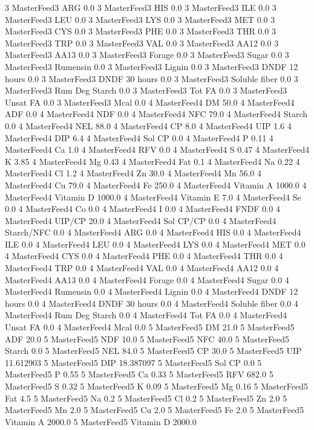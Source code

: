 \documentclass[letterpaper,10pt,english]{sphinxmanual}
\begin{document}
\begin{sphinxVerbatim}[commandchars=\\\{\},numbers=left,firstnumber=1,stepnumber=1]
3 MasterFeed3 ARG 0.0
3 MasterFeed3 HIS 0.0
3 MasterFeed3 ILE 0.0
3 MasterFeed3 LEU 0.0
3 MasterFeed3 LYS 0.0
3 MasterFeed3 MET 0.0
3 MasterFeed3 CYS 0.0
3 MasterFeed3 PHE 0.0
3 MasterFeed3 THR 0.0
3 MasterFeed3 TRP 0.0
3 MasterFeed3 VAL 0.0
3 MasterFeed3 AA\PYGZsh{}12 0.0
3 MasterFeed3 AA\PYGZsh{}13 0.0
3 MasterFeed3 \PYGZpc{} Forage 0.0
3 MasterFeed3 Sugar \PYGZpc{} 0.0
3 MasterFeed3 Rumensin 0.0
3 MasterFeed3 Lignin 0.0
3 MasterFeed3 DNDF 12 hours 0.0
3 MasterFeed3 DNDF 30 hours 0.0
3 MasterFeed3 Soluble fiber 0.0
3 MasterFeed3 Rum Deg Starch 0.0
3 MasterFeed3 Tot FA 0.0
3 MasterFeed3 Unsat FA 0.0
3 MasterFeed3 Mcal 0.0
4 MasterFeed4 DM 50.0
4 MasterFeed4 ADF 0.0
4 MasterFeed4 NDF 0.0
4 MasterFeed4 NFC 79.0
4 MasterFeed4 Starch 0.0
4 MasterFeed4 NEL 88.0
4 MasterFeed4 CP 8.0
4 MasterFeed4 UIP 1.6
4 MasterFeed4 DIP 6.4
4 MasterFeed4 Sol CP 0.0
4 MasterFeed4 P 0.11
4 MasterFeed4 Ca 1.0
4 MasterFeed4 RFV 0.0
4 MasterFeed4 S 0.47
4 MasterFeed4 K 3.85
4 MasterFeed4 Mg 0.43
4 MasterFeed4 Fat 0.1
4 MasterFeed4 Na 0.22
4 MasterFeed4 Cl 1.2
4 MasterFeed4 Zn 30.0
4 MasterFeed4 Mn 56.0
4 MasterFeed4 Cu 79.0
4 MasterFeed4 Fe 250.0
4 MasterFeed4 Vitamin A 1000.0
4 MasterFeed4 Vitamin D 1000.0
4 MasterFeed4 Vitamin E 7.0
4 MasterFeed4 Se 0.0
4 MasterFeed4 Co 0.0
4 MasterFeed4 I 0.0
4 MasterFeed4 FNDF 0.0
4 MasterFeed4 UIP/CP 20.0
4 MasterFeed4 Sol CP/CP 0.0
4 MasterFeed4 Starch/NFC 0.0
4 MasterFeed4 ARG 0.0
4 MasterFeed4 HIS 0.0
4 MasterFeed4 ILE 0.0
4 MasterFeed4 LEU 0.0
4 MasterFeed4 LYS 0.0
4 MasterFeed4 MET 0.0
4 MasterFeed4 CYS 0.0
4 MasterFeed4 PHE 0.0
4 MasterFeed4 THR 0.0
4 MasterFeed4 TRP 0.0
4 MasterFeed4 VAL 0.0
4 MasterFeed4 AA\PYGZsh{}12 0.0
4 MasterFeed4 AA\PYGZsh{}13 0.0
4 MasterFeed4 \PYGZpc{} Forage 0.0
4 MasterFeed4 Sugar \PYGZpc{} 0.0
4 MasterFeed4 Rumensin 0.0
4 MasterFeed4 Lignin 0.0
4 MasterFeed4 DNDF 12 hours 0.0
4 MasterFeed4 DNDF 30 hours 0.0
4 MasterFeed4 Soluble fiber 0.0
4 MasterFeed4 Rum Deg Starch 0.0
4 MasterFeed4 Tot FA 0.0
4 MasterFeed4 Unsat FA 0.0
4 MasterFeed4 Mcal 0.0
5 MasterFeed5 DM 21.0
5 MasterFeed5 ADF 20.0
5 MasterFeed5 NDF 10.0
5 MasterFeed5 NFC 40.0
5 MasterFeed5 Starch 0.0
5 MasterFeed5 NEL 84.0
5 MasterFeed5 CP 30.0
5 MasterFeed5 UIP 11.612903
5 MasterFeed5 DIP 18.387097
5 MasterFeed5 Sol CP 0.0
5 MasterFeed5 P 0.55
5 MasterFeed5 Ca 0.33
5 MasterFeed5 RFV 682.0
5 MasterFeed5 S 0.32
5 MasterFeed5 K 0.09
5 MasterFeed5 Mg 0.16
5 MasterFeed5 Fat 4.5
5 MasterFeed5 Na 0.2
5 MasterFeed5 Cl 0.2
5 MasterFeed5 Zn 2.0
5 MasterFeed5 Mn 2.0
5 MasterFeed5 Cu 2.0
5 MasterFeed5 Fe 2.0
5 MasterFeed5 Vitamin A 2000.0
5 MasterFeed5 Vitamin D 2000.0

\end{sphinxVerbatim}
\end{document}
